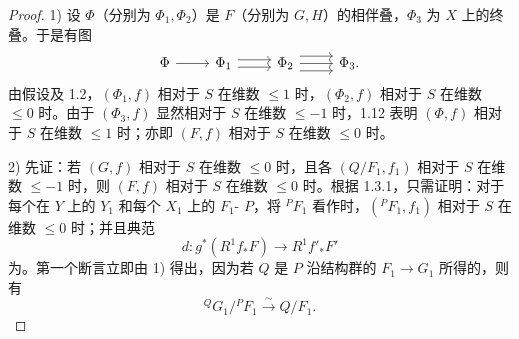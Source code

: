 \begin{proof}
1) 设 $\Phi$（分别为 $\Phi_1,\Phi_2$）是 $F$（分别为 $G,H$）的相伴叠，$\Phi_3$ 为 $X$ 上的终叠。于是有图
\[
\begin{tikzcd}
\Phi\arrow[r]&\Phi_1\arrow[r,shift left=.6ex]\arrow[r,shift right=.6ex]&\Phi_2\arrow[r,shift left=1.2ex]\arrow[r]\arrow[r,shift right=1.2ex]&\Phi_3.
\end{tikzcd}
\]
由假设及 1.2，$(\Phi_1,f)$ 相对于 $S$ 在维数 $\leqslant1$ 时，$(\Phi_2,f)$ 相对于 $S$ 在维数 $\leqslant0$ 时。由于 $(\Phi_3,f)$ 显然相对于 $S$ 在维数 $\leqslant-1$ 时，1.12 表明 $(\Phi,f)$ 相对于 $S$ 在维数 $\leqslant1$ 时；亦即 $(F,f)$ 相对于 $S$ 在维数 $\leqslant0$ 时。

2) 先证：若 $(G,f)$ 相对于 $S$ 在维数 $\leqslant0$ 时，且各 $(Q/F_1,f_1)$ 相对于 $S$ 在维数 $\leqslant-1$ 时，则 $(F,f)$ 相对于 $S$ 在维数 $\leqslant0$ 时。根据 1.3.1，只需证明：对于每个在 $Y$ 上的 $Y_1$ 和每个 $X_1$ 上的 $F_1$- $P$，将 ${}^PF_1$ 看作时，$({}^PF_1,f_1)$ 相对于 $S$ 在维数 $\leqslant0$ 时；并且典范
\[d:g^*(R^1f_*F)\longrightarrow R^1f'_*F'\]
为。第一个断言立即由 1) 得出，因为若 $Q$ 是 $P$ 沿结构群的 $F_1\to G_1$ 所得的，则有
\[{}^QG_1/{}^PF_1\xrightarrow{\sim}Q/F_1.\]


\end{proof}
